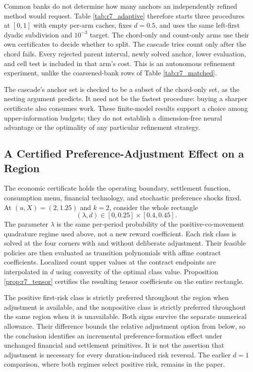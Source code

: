 Common banks do not determine how many anchors an independently refined method would request. Table \ref{tab:r7_adaptive} therefore starts three procedures at $[0,1]$ with empty per-arm caches, fixes $d=0.5$, and uses the same left-first dyadic subdivision and $10^{-3}$ target. The chord-only and count-only arms use their own certificates to decide whether to split. The cascade tries count only after the chord fails. Every rejected parent interval, newly solved anchor, lower evaluation, and cell test is included in that arm's cost. This is an autonomous refinement experiment, unlike the coarsened-bank rows of Table \ref{tab:r7_matched}.


The cascade's anchor set is checked to be a subset of the chord-only set, as the nesting argument predicts. It need not be the fastest procedure: buying a sharper certificate also consumes work. These finite-model results support a choice among upper-information budgets; they do not establish a dimension-free neural advantage or the optimality of any particular refinement strategy.

\subsection{A Certified Preference-Adjustment Effect on a Region}
\label{sec:r7_region_evidence}
The economic certificate holds the operating boundary, settlement function, consumption menu, financial technology, and stochastic preference shocks fixed. At $(u,X)=(2,1.25)$ and $k=2$, consider the whole rectangle
\[
 (\lambda,d)\in[0,0.25]\times[0.4,0.45].
\]
The parameter $\lambda$ is the same per-period probability of the positive-co-movement quadrature regime used above, not a new reward coefficient. Each risk class is solved at the four corners with and without deliberate adjustment. Their feasible policies are then evaluated as transition polynomials with affine contract coefficients. Localized count upper values at the contract endpoints are interpolated in $d$ using convexity of the optimal class value. Proposition \ref{prop:r7_tensor} certifies the resulting tensor coefficients on the entire rectangle.


The positive first-risk class is strictly preferred throughout the region when adjustment is available, and the nonpositive class is strictly preferred throughout the same region when it is unavailable. Both signs survive the separate numerical allowance. Their difference bounds the relative adjustment option from below, so the conclusion identifies an incremental preference-formation effect under unchanged financial and settlement primitives. It is not the assertion that adjustment is necessary for every duration-induced risk reversal. The earlier $d=1$ comparison, where both regimes select positive risk, remains in the paper.

